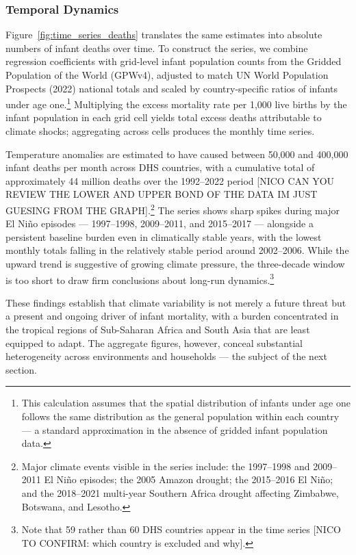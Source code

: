 \documentclass[a4paper]{article}
\begin{document}
\subsubsection{Temporal Dynamics}

Figure~\ref{fig:time_series_deaths} translates the same estimates into absolute numbers of infant deaths over time. To construct the series, we combine regression coefficients with grid-level infant population counts from the Gridded Population of the World (GPWv4), adjusted to match UN World Population Prospects (2022) national totals and scaled by country-specific ratios of infants under age one.\footnote{This calculation assumes that the spatial distribution of infants under age one follows the same distribution as the general population within each country — a standard approximation in the absence of gridded infant population data.} Multiplying the excess mortality rate per 1,000 live births by the infant population in each grid cell yields total excess deaths attributable to climate shocks; aggregating across cells produces the monthly time series.

Temperature anomalies are estimated to have caused between 50,000 and 400,000 infant deaths per month across DHS countries, with a cumulative total of approximately 44 million deaths over the 1992--2022 period [NICO CAN YOU REVIEW THE LOWER AND UPPER BOND OF THE DATA IM JUST GUESING FROM THE GRAPH].\footnote{Major climate events visible in the series include: the 1997--1998 and 2009--2011 El Niño episodes; the 2005 Amazon drought; the 2015--2016 El Niño; and the 2018--2021 multi-year Southern Africa drought affecting Zimbabwe, Botswana, and Lesotho.} The series shows sharp spikes during major El Niño episodes — 1997--1998, 2009--2011, and 2015--2017 — alongside a persistent baseline burden even in climatically stable years, with the lowest monthly totals falling in the relatively stable period around 2002--2006. While the upward trend is suggestive of growing climate pressure, the three-decade window is too short to draw firm conclusions about long-run dynamics.\footnote{Note that 59 rather than 60 DHS countries appear in the time series [NICO TO CONFIRM: which country is excluded and why].} 

These findings establish that climate variability is not merely a future threat but a present and ongoing driver of infant mortality, with a burden concentrated in the tropical regions of Sub-Saharan Africa and South Asia that are least equipped to adapt. The aggregate figures, however, conceal substantial heterogeneity across environments and households — the subject of the next section.
\end{document}
